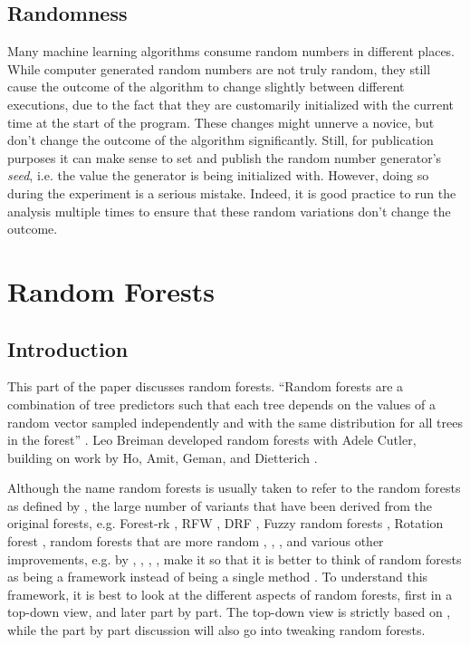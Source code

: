 \documentclass[a4paper,man,12pt,apacite,floatsintext,draftfirst]{apa6} %
\begin{document}
\subsection{Randomness}
Many machine learning algorithms consume random numbers in different places.
While computer generated random numbers are not truly random, they still
cause the outcome of the algorithm to change slightly between different
executions, due to the fact that they are customarily initialized with
the current time at the start of the program.
These changes might unnerve a novice, but don't change the outcome of the
algorithm significantly.
Still, for publication purposes it can make sense to set and publish the
random number generator's \emph{seed}, i.e. the value the generator is being
initialized with.
However, doing so during the experiment
is a serious mistake.
Indeed, it is good practice to run the analysis multiple times to ensure
that these random variations don't change the outcome.

\newpage
\section{Random Forests}

\subsection{Introduction}
This part of the paper discusses random forests.
“Random forests are a combination of tree predictors such that each tree
depends on the values of a random vector sampled independently and with
the same distribution for all trees in the forest” \cite{breiman2001random}.
Leo Breiman developed random forests with Adele Cutler, building on work
by Ho, Amit, Geman, and Dietterich \cite{wpRF}.

Although the name random forests is usually taken to refer to the random
forests as defined by \cite{breiman2001random}, the large number of
variants that have been derived from the original forests, e.g.
Forest-rk \cite{bernard2008forest}, RFW \cite{maudes2012random},
DRF \cite{bernard2012dynamic}, Fuzzy random forests \cite{bonissone2008fuzzy},
Rotation forest \cite{rodriguez2006rotation}, random forests that are
more random \cite{geurts2006extremely}, \cite{liu2005maximizing},
\cite{cutler2001pert}, and various other improvements, e.g. by
\cite{banfield2007comparison}, \cite{robnik2004improving},
\cite{strobl2009introduction}, \cite{zhang2012bias}, make it so that it
is better to think of random forests as being a framework instead of being
a single method \cite{wpRF}.
To understand this framework, it is best to look at the different aspects
of random forests, first in a top-down view, and later part by part.
The top-down view is strictly based on \cite{breiman2001random},
while the part by part discussion will also go into tweaking random forests.
\end{document}
